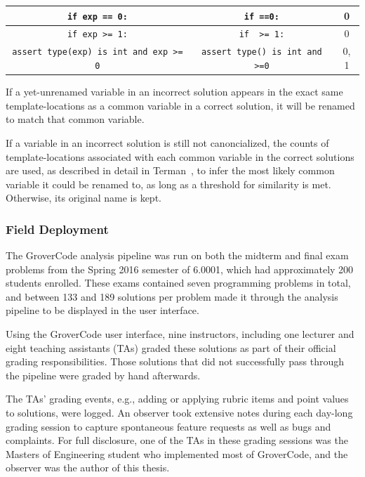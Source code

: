 \begin{table}
\begin{tabular}{|c|c|c|}
\hline
\texttt{if exp == 0:} & \texttt{if \underline{\hspace{1em}}==0:} & 0 \\
\hline
\texttt{if exp >= 1:} & \texttt{if \underline{\hspace{1em}} >= 1:} & 0 \\
\hline
\texttt{assert type(exp) is int and exp >= 0} & \texttt{assert type(\underline{\hspace{1em}}) is int and \underline{\hspace{1em}}>=0} & 0, 1 \\
\hline
\end{tabular}
\label{table:template-location}
\end{table}

If a yet-unrenamed variable in an incorrect solution appears in the exact same template-locations as a common variable in a correct solution, it will be renamed to match that common variable.

If a variable in an incorrect solution is still not canoncialized, the counts of template-locations associated with each common variable in the correct solutions are used, as described in detail in Terman~\cite{staceythesis}, to infer the most likely common variable it could be renamed to, as long as a threshold for similarity is met. Otherwise, its original name is kept. 

\subsubsection{Field Deployment}

The GroverCode analysis pipeline was run on both the midterm and final exam problems from the Spring 2016 semester of 6.0001, which had approximately 200 students enrolled. These exams contained seven programming problems in total, and between 133 and 189 solutions per problem made it through the analysis pipeline to be displayed in the user interface. 

Using the GroverCode user interface, nine instructors, including one lecturer and eight teaching assistants (TAs) graded these solutions as part of their official grading responsibilities. Those solutions that did not successfully pass through the pipeline were graded by hand afterwards.

The TAs' grading events, e.g., adding or applying rubric items and point values to solutions, were logged. An observer took extensive notes during each day-long grading session to capture spontaneous feature requests as well as bugs and complaints. For full disclosure, one of the TAs in these grading sessions was the Masters of Engineering student who implemented most of GroverCode, and the observer was the author of this thesis.

